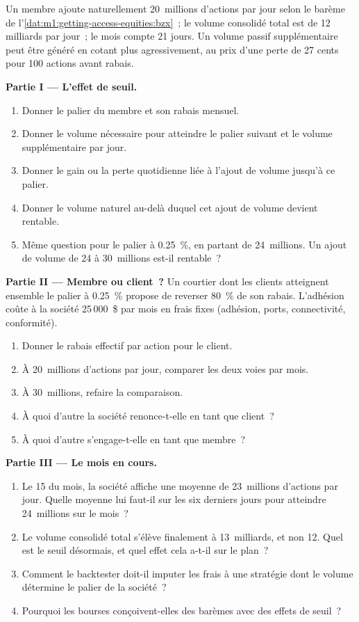 \begin{problem}\label{pb:m1:getting-access-equities:1}
Un membre ajoute naturellement 20~millions d'actions par jour selon le barème
de l'\cref{dat:m1:getting-access-equities:bzx}~; le volume consolidé total est de 12
milliards par jour~; le mois compte 21 jours. Un volume passif supplémentaire peut être généré
en cotant plus agressivement, au prix d'une perte de 27 cents pour 100 actions avant
rabais.

\medskip\noindent\textbf{Partie I --- L'effet de seuil.}
\begin{enumerate}
\item Donner le palier du membre et son rabais mensuel.
\item Donner le volume nécessaire pour atteindre le palier suivant et le volume supplémentaire par jour.
\item Donner le gain ou la perte quotidienne liée à l'ajout de volume jusqu'à ce palier.
\item Donner le volume naturel au-delà duquel cet ajout de volume devient rentable.
\item Même question pour le palier à 0.25~\%, en partant de 24~millions. Un ajout de
volume de 24 à 30~millions est-il rentable~?
\end{enumerate}

\medskip\noindent\textbf{Partie II --- Membre ou client~?}
Un courtier dont les clients atteignent ensemble le palier à 0.25~\% propose de
reverser 80~\% de son rabais. L'adhésion coûte à la société 25\,000~\$ par mois en
frais fixes (adhésion, ports, connectivité, conformité).
\begin{enumerate}[resume]
\item Donner le rabais effectif par action pour le client.
\item À 20~millions d'actions par jour, comparer les deux voies par mois.
\item À 30~millions, refaire la comparaison.
\item À quoi d'autre la société renonce-t-elle en tant que client~?
\item À quoi d'autre s'engage-t-elle en tant que membre~?
\end{enumerate}

\medskip\noindent\textbf{Partie III --- Le mois en cours.}
\begin{enumerate}[resume]
\item Le 15 du mois, la société affiche une moyenne de 23~millions d'actions par jour. Quelle
moyenne lui faut-il sur les six derniers jours pour atteindre 24~millions sur le mois~?
\item Le volume consolidé total s'élève finalement à 13~milliards, et non 12. Quel est
le seuil désormais, et quel effet cela a-t-il sur le plan~?
\item Comment le backtester doit-il imputer les frais à une stratégie dont le volume
détermine le palier de la société~?
\item Pourquoi les bourses conçoivent-elles des barèmes avec des effets de seuil~?
\end{enumerate}


\end{problem}
